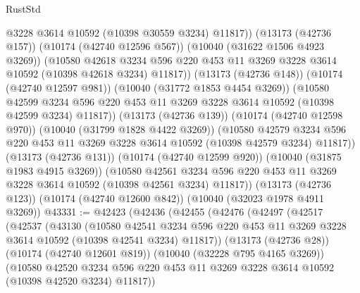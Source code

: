 \begin{lexlean}{RustStd}
\begin{coremodule}
                @3228
                @3614
                @10592
                (@10398 @30559 @3234)
                @11817))
            (@13173 (@42736 @157))
            (@10174 (@42740 @12596 @567))
            (@10040 (@31622 @1506 @4923 @3269))
            (@10580
              @42618
              @3234
              @596
              @220
              @453
              @11
              @3269
              @3228
              @3614
              @10592
              (@10398 @42618 @3234)
              @11817))
          (@13173 (@42736 @148))
          (@10174 (@42740 @12597 @981))
          (@10040 (@31772 @1853 @4454 @3269))
          (@10580
            @42599
            @3234
            @596
            @220
            @453
            @11
            @3269
            @3228
            @3614
            @10592
            (@10398 @42599 @3234)
            @11817))
        (@13173 (@42736 @139))
        (@10174 (@42740 @12598 @970))
        (@10040 (@31799 @1828 @4422 @3269))
        (@10580
          @42579
          @3234
          @596
          @220
          @453
          @11
          @3269
          @3228
          @3614
          @10592
          (@10398 @42579 @3234)
          @11817))
      (@13173 (@42736 @131))
      (@10174 (@42740 @12599 @920))
      (@10040 (@31875 @1983 @4915 @3269))
      (@10580
        @42561
        @3234
        @596
        @220
        @453
        @11
        @3269
        @3228
        @3614
        @10592
        (@10398 @42561 @3234)
        @11817))
    (@13173 (@42736 @123))
    (@10174 (@42740 @12600 @842))
    (@10040 (@32023 @1978 @4911 @3269))
@43331 := @42423
    (@42436
      (@42455
        (@42476
          (@42497
            (@42517
              (@42537
                (@43130
                  (@10580
                    @42541
                    @3234
                    @596
                    @220
                    @453
                    @11
                    @3269
                    @3228
                    @3614
                    @10592
                    (@10398 @42541 @3234)
                    @11817))
                (@13173 (@42736 @28))
                (@10174 (@42740 @12601 @819))
                (@10040 (@32228 @795 @4165 @3269))
                (@10580
                  @42520
                  @3234
                  @596
                  @220
                  @453
                  @11
                  @3269
                  @3228
                  @3614
                  @10592
                  (@10398 @42520 @3234)
                  @11817))

\end{coremodule}
\end{lexlean}
